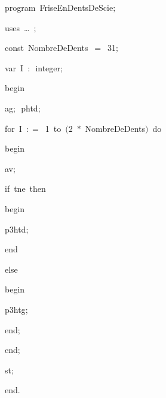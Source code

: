 
{
\parindent {}
\medskip

\carrenoir
\vspace{\neglskip}\mbox{\blc  \idt  \mcl program\idt\ FriseEnDentsDeScie$;$
}\par 
\vspace{\neglskip}\mbox{\blc \blk\idt \mcl uses\idt \ \ldots\ $;$
}\par 
\pagebreak[3] 
\vspace{\neglskip}\mbox{\blc  \blk\idt  \mcl const\idt \ NombreDeDents\ $=$\ 31$;$}\par 
\pagebreak[3] 
\vspace{\neglskip}\mbox{\blc  \blk\idt  \mcl var\idt \ I\ $:$\ integer$;$}\par 
\vspace{\neglskip}\mbox{\blc  \idt  \mcl begin\idt }\par 
\vspace{\neglskip}\mbox{\blc  \blk\idt  ag$;$\ phtd$;$\ }\par 
\pagebreak[3] 
\vspace{\neglskip}\mbox{\blc  \blk\idt  \mcl for\idt \ I\ $:$$=$\ 1\ \mcl to\idt \ $($2\ $\ast$\ NombreDeDents$)$\ \mcl do\idt }\par 
\vspace{\neglskip}\mbox{\blc  \blk\blk\idt  \mcl begin\idt }\par 
\vspace{\neglskip}\mbox{\blc  \blk\blk\blk\idt  av$;$\ }\par 
\pagebreak[3] 
\vspace{\neglskip}\mbox{\blc  \blk\blk\blk\idt  \mcl if\idt \ tne\ \mcl then\idt }\par 
\vspace{\neglskip}\mbox{\blc  \blk\blk\blk\blk\idt  \mcl begin\idt }\par 
\vspace{\neglskip}\mbox{\blc  \blk\blk\blk\blk\blk\idt  p3htd$;$\ }\par 
\vspace{\neglskip}\mbox{\blc  \blk\blk\blk\blk\idt  \mcl end\idt }\par 
\pagebreak[3] 
\vspace{\neglskip}\mbox{\blc  \blk\blk\blk\idt  \mcl else\idt }\par 
\vspace{\neglskip}\mbox{\blc  \blk\blk\blk\blk\idt  \mcl begin\idt }\par 
\vspace{\neglskip}\mbox{\blc  \blk\blk\blk\blk\blk\idt  p3htg$;$\ }\par 
\vspace{\neglskip}\mbox{\blc  \blk\blk\blk\blk\idt  \mcl end\idt $;$}\par 
\vspace{\neglskip}\mbox{\blc  \blk\blk\idt  \mcl end\idt $;$}\par 
\vspace{\neglskip}\mbox{\blc  \blk\idt  st$;$}\par 
\vspace{\neglskip}\mbox{\blc  \idt  \mcl end\idt $.$}\par 

\medskip }

